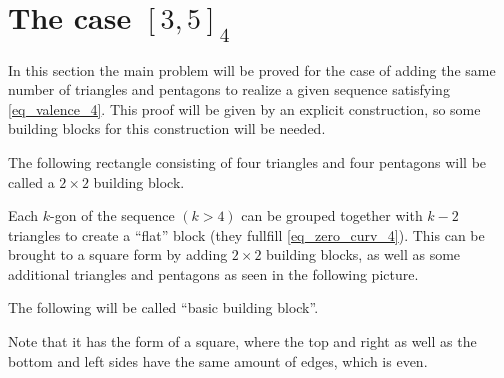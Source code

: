 \section{The case $[3, 5]_4$}
In this section the main problem will be proved for the case of adding the same number of triangles and pentagons to realize a given sequence satisfying \ref{eq_valence_4}. This proof will be given by an explicit construction, so some building blocks for this construction will be needed.
\begin{definition}
  The following rectangle consisting of four triangles and four pentagons will be called a $2 \times 2$ building block.
  \begin{figure}[htpp]
    \centering
  \end{figure}
\end{definition}

Each $k$-gon of the sequence $(k > 4)$ can be grouped together with $k-2$ triangles to create a ``flat'' block (they fullfill \ref{eq_zero_curv_4}). This can be brought to a square form by adding $2 \times 2$ building blocks, as well as some additional triangles and pentagons as seen in the following picture.
\begin{definition} The following will be called ``basic building block''.
  \begin{figure}[htpp]
    \centering
  \end{figure}
  Note that it has the form of a square, where the top and right as well as the bottom and left sides have the same amount of edges, which is even.
\end{definition}

